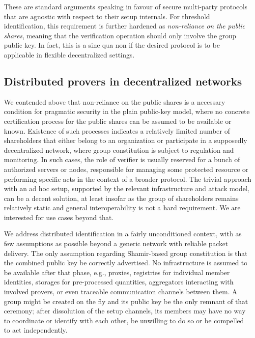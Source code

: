 \documentclass{iacrtrans}
\begin{document}
These are standard arguments speaking in favour
of secure multi-party protocols that are agnostic
with respect to their setup internals.
For threshold identification,
this requirement is further hardened as
\textit{non-reliance on the public shares},
meaning that the verification operation should only involve
the group public key.
In fact, this is a sine qua non if the desired protocol is
to be applicable in flexible decentralized settings.


\subsection{Distributed provers in decentralized networks}\label{section_distributed_provers}

We contended above that non-reliance on the public shares
is a necessary condition for pragmatic security
in the plain public-key model, where
no concrete certification process
for the public shares can be assumed
to be available or known.
Existence of such processes indicates
a relatively limited number of shareholders
that either belong to an organization or participate
in a supposedly decentralized network,
where group constitution is subject to
regulation and monitoring.
In such cases,
the role of verifier is usually reserved for
a bunch of authorized servers or nodes,
responsible for managing some protected resource or
performing specific acts in the context of a broader protocol.
The trivial approach with an ad hoc setup,
supported by the relevant infrastructure
and attack model,
can be a decent solution,
at least insofar as the group of shareholders
remains relatively static
and general interoperability
is not a hard requirement.
We are interested for use cases beyond that.

We address distributed identification in
a fairly unconditioned context,
with as few assumptions as possible
beyond a generic network
with reliable packet delivery.
The only assumption regarding
Shamir-based group constitution is that
the combined public key
be correctly advertised.
No infrastructure is
assumed to be available after that phase,
e.g., proxies, registries for individual member identities,
storages for pre-processed quantities,
aggregators interacting with involved provers,
or even traceable communication channels between them.
A group might be created on the fly and its public key
be the only remnant of that ceremony;
after dissolution of the setup channels,
its members may have no way to coordinate or identify
with each other, be unwilling to do so or be compelled to
act independently.
\end{document}
